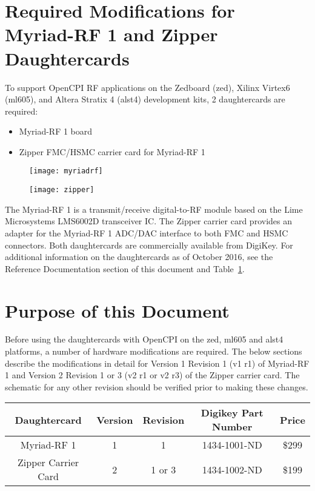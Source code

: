 \section*{Required Modifications for Myriad-RF 1 and Zipper Daughtercards}
To support OpenCPI RF applications on the Zedboard (zed), Xilinx Virtex6 (ml605), and Altera Stratix 4 (alst4) development kits, 2 daughtercards are required:\par
	\begin{itemize}
	\item[1)] Myriad-RF 1 board
	\item[2)] Zipper FMC/HSMC carrier card for Myriad-RF 1
	\end{itemize}
	\begin{figure}[ht]
	\centering
		\begin{minipage}{.5\textwidth}
			\centering\texttt{[image: myriadrf]}
			\label{fig:myriadrf}
		\end{minipage}%
		\begin{minipage}{.5\textwidth}
			\centering\texttt{[image: zipper]}
			\label{fig:zipper}
		\end{minipage}
	\end{figure}
\noindent The Myriad-RF 1 is a transmit/receive digital-to-RF module based on the Lime Microsystems LMS6002D transceiver IC. The Zipper carrier card provides an adapter for the Myriad-RF 1 ADC/DAC interface to both FMC and HSMC connectors. Both daughtercards are commercially available from DigiKey. For additional information on the daughtercards as of October 2016, see the Reference Documentation section of this document and Table~\ref{tab:version_info}.

\section*{Purpose of this Document}
Before using the daughtercards with OpenCPI on the zed, ml605 and alst4 platforms, a number of hardware modifications are required. The below sections describe the modifications in detail for Version 1 Revision 1 (v1 r1) of Myriad-RF 1 and Version 2 Revision 1 or 3 (v2 r1 or v2 r3) of the Zipper carrier card. The schematic for any other revision should be verified prior to making these changes.
		\begin{table}[h]
			\scriptsize
			\begin{center}
  				\begin{tabular}{|c|c|c|c|c|}
    			\hline
    			\rowcolor{blue}
    			Daughtercard & Version & Revision & Digikey Part Number & Price\\
    			\hline
    			Myriad-RF 1 & 1 & 1 & 1434-1001-ND & \$299\\
    			\hline
    			Zipper Carrier Card & 2 & 1 or 3 & 1434-1002-ND & \$199\\
    			\hline
   				\end{tabular}
   				\label{tab:version_info}
		  	\end{center}
   		\end{table}
\pagebreak


